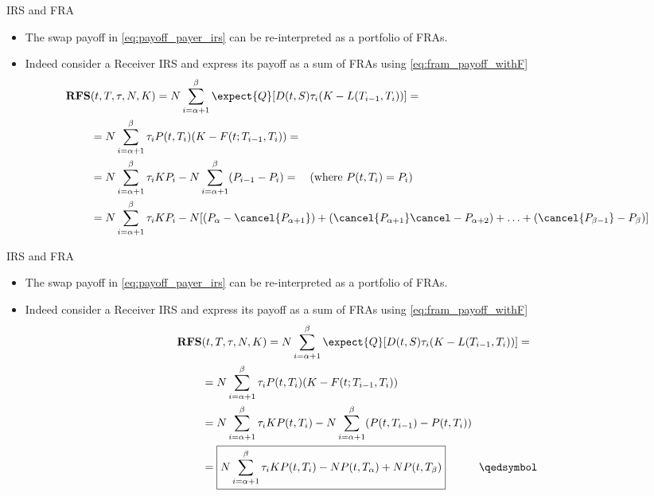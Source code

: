 \documentclass{beamer}
\begin{document}
\begin{frame}{IRS and FRA}
	\begin{itemize}
		\item The swap payoff in \cref{eq:payoff_payer_irs} can be re-interpreted as a portfolio of FRAs.
		\item Indeed consider a Receiver IRS and express its payoff as a sum of FRAs using \cref{eq:fram_payoff_withF}
		\begin{equation*}
			\begin{aligned}
				\textbf{RFS}&(t,T,\tau,N,K) = N\sum_{i=\alpha+1}^{\beta}\expect{Q}[D(t,S)\tau_i(K - L(T_{i-1},T_i))]=\\
				&=N\sum_{i=\alpha+1}^{\beta}\tau_i P(t,T_i)(K-F(t;T_{i-1},T_i))=\\
				&=N\sum_{i=\alpha+1}^{\beta}\tau_i KP_i-N\sum_{i=\alpha+1}^{\beta}(P_{i-1}-P_i)=\quad (\text{where }P(t, T_i) = P_i) \\
				&=N\sum_{i=\alpha+1}^{\beta}\tau_i KP_i-N[(P_\alpha -\cancel{P_{\alpha+1}}) + (\cancel{P_{\alpha+1}} \cancel-{P_{\alpha+2}}) + \ldots + (\cancel{P_{\beta-1}} - P_{\beta})] \\
			\end{aligned}
		\end{equation*}
	\end{itemize}
\end{frame}

\begin{frame}{IRS and FRA}
	\begin{itemize}
		\item The swap payoff in \cref{eq:payoff_payer_irs} can be re-interpreted as a portfolio of FRAs.
		\item Indeed consider a Receiver IRS and express its payoff as a sum of FRAs using \cref{eq:fram_payoff_withF}
		\begin{equation}
			\begin{aligned}
				\textbf{RFS}&(t,T,\tau,N,K) = 	N\sum_{i=\alpha+1}^{\beta}\expect{Q}[D(t,S)\tau_i(K - L(T_{i-1},T_i))]=\\
				&=N\sum_{i=\alpha+1}^{\beta}\tau_i P(t,T_i)(K-F(t;T_{i-1},T_i))\\
				&=N\sum_{i=\alpha+1}^{\beta}\tau_i KP(t,T_i)-N\sum_{i=\alpha+1}^{\beta}(P(t,T_{i-1})-P(t,T_i)) \\
				&=\boxed{N\sum_{i=\alpha+1}^{\beta}\tau_i KP(t,T_i)-NP(t,T_\alpha)+NP(t,T_\beta)}\quad\quad\quad\qedsymbol
			\end{aligned}
		\label{eq:swap_as_sum_fra}
		\end{equation}
	\end{itemize}
\end{frame}
\end{document}
